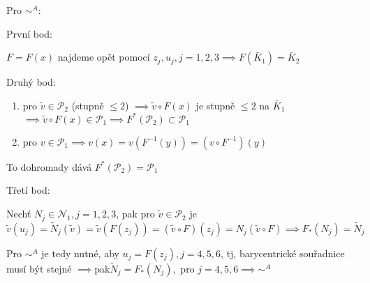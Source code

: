 \documentclass[../main.tex]{subfiles}
\begin{document}
\begin{example}
    Pro $\sim^A$:

    První bod:

    $F = F(x)$ najdeme opět pomocí $z_j, u_j, j=1,2,3 \implies F(\bar{K}_1) = \bar{K}_2$

    Druhý bod:

    \begin{enumerate}
        \item pro $\tilde{v} \in \mathcal{P}_2$ (stupně $\leq 2$) $\implies \tilde{v} \circ F(x)$ je stupně $\leq 2 $ na $\bar{K}_1$ $\implies \tilde{v} \circ F(x) \in \mathcal{P_1} \implies F^*(\mathcal{P}_2) \subset \mathcal{P}_1$
        \item pro $v\in\mathcal{P}_1 \implies v(x) = v(F^{-1}(y)) = (v\circ F^{-1})(y)$
    \end{enumerate} 
    To dohromady dává $F^* (\mathcal{P}_2) = \mathcal{P}_1$

    Třetí bod:

    Nechť $N_j \in \mathcal{N}_1, j=1,2,3$, pak pro $\tilde{v}\in\mathcal{P}_2$ je $\tilde{v}(u_j) = \tilde{N}_j(\tilde{v}) = \tilde{v}(F(z_j)) = (\tilde{v}\circ F )(z_j ) = N_j (\tilde{v}\circ F) \implies F_*(N_j) = \tilde{N}_j$

    Pro $\sim^A$ je tedy nutné, aby $u_j = F(z_j), j=4,5,6$, tj, barycentrické souřadnice musí být stejné $\implies $pak$ \tilde{N}_j = F_*(N_j),$ pro $j=4,5,6 \implies \sim^A$
    
\end{example}

\begin{example}


    
\end{example}
\end{document}
